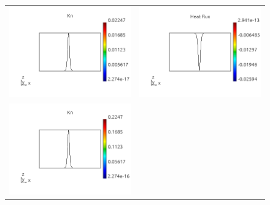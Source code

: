 \documentclass[review]{elsarticle}
\begin{document}
\begin{figure}[tbh]
\begin{center}
\begin{tabular}{cc}
      \includegraphics[width=\psize\textwidth]{figs/Kn_p41D1e3.png} &
      \includegraphics[width=\psize\textwidth]{figs/hflux_p41D1e3.png} \\
      \includegraphics[width=\psize\textwidth]{figs/Kn_p41D1e2.png} &

\end{tabular}
\end{center}
\end{figure}
\end{document}
